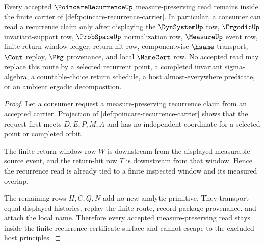 \begin{theorem}
\label{thm:poincare-recurrence-measure-preserving-nonescape}
Every accepted $\PoincareRecurrenceUp$ measure-preserving read remains inside the finite carrier of \autoref{def:poincare-recurrence-carrier}. In particular, a consumer can read a recurrence claim only after displaying the $\DynSystemUp$ row, $\ErgodicUp$ invariant-support row, $\ProbSpaceUp$ normalization row, $\MeasureUp$ event row, finite return-window ledger, return-hit row, componentwise $\hsame$ transport, $\Cont$ replay, $\Pkg$ provenance, and local $\NameCert$ row. No accepted read may replace this route by a selected recurrent point, a completed invariant sigma-algebra, a countable-choice return schedule, a host almost-everywhere predicate, or an ambient ergodic decomposition.
\end{theorem}
\begin{proof}
Let a consumer request a measure-preserving recurrence claim from an accepted carrier. Projection of \autoref{def:poincare-recurrence-carrier} shows that the request first meets $D,E,P,M,A$ and has no independent coordinate for a selected point or completed orbit.

The finite return-window row $W$ is downstream from the displayed measurable source event, and the return-hit row $T$ is downstream from that window. Hence the recurrence read is already tied to a finite inspected window and its measured overlap.

The remaining rows $H,C,Q,N$ add no new analytic primitive. They transport equal displayed histories, replay the finite route, record package provenance, and attach the local name. Therefore every accepted measure-preserving read stays inside the finite recurrence certificate surface and cannot escape to the excluded host principles.
\end{proof}



